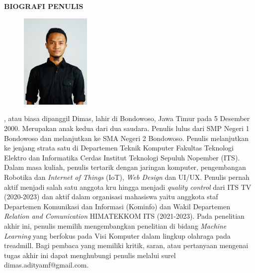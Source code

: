 \begin{center}
  \Large
  \textbf{BIOGRAFI PENULIS}
\end{center}


\vspace{2ex}

\begin{figure}
  \centering
  \vspace{-3ex}
  \includegraphics[width=0.3\textwidth]{gambar/biodimas.jpg}
  \vspace{-4ex}
\end{figure}

\name{}, atau biasa dipanggil Dimas, lahir di Bondowoso, Jawa Timur pada 5 Desember 2000. Merupakan anak kedua dari dua saudara. Penulis lulus dari SMP Negeri 1 Bondowoso dan melanjutkan ke SMA Negeri 2 Bondowoso. Penulis melanjutkan ke jenjang strata satu di Departemen Teknik Komputer Fakultas Teknologi Elektro dan Informatika Cerdas Institut Teknologi Sepuluh Nopember (ITS). Dalam masa kuliah, penulis tertarik dengan jaringan komputer, pengembangan Robotika dan \emph{Internet of Things} (IoT), \emph{Web Design} dan UI/UX. Penulis pernah aktif menjadi salah satu anggota kru hingga menjadi \emph{quality control} dari ITS TV (2020-2023) dan aktif dalam organisasi mahasiswa yaitu anggkota staf Departemen Komunikasi dan Informasi (Kominfo) dan Wakil Departemen \emph{Relation and Comunication} HIMATEKKOM ITS (2021-2023). Pada penelitian akhir ini, penulis memilih mengembangkan penelitian di bidang \emph{Machine Learning} yang berfokus pada Visi Komputer dalam lingkup olahraga pada treadmill. Bagi pembaca yang memiliki kritik, saran, atau pertanyaan mengenai tugas akhir ini dapat menghubungi penulis melalui surel dimas.adityamf@gmail.com.

